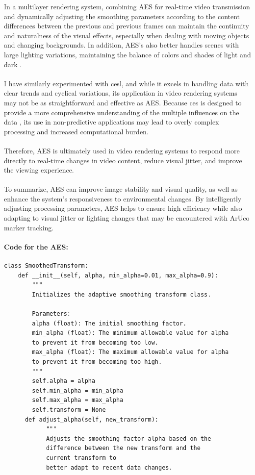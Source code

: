 \documentclass[12pt]{article}
\begin{document}
\begin{enumerate}
\begin{enumerate}
                        In a multilayer rendering system, combining AES for real-time video transmission and dynamically adjusting the smoothing parameters according to the content differences between the previous and previous frames can maintain the continuity and naturalness of the visual effects, especially when dealing with moving objects and changing backgrounds. In addition, AES's also better handles scenes with large lighting variations, maintaining the balance of colors and shades of light and dark \cite{7298776}.
                        \\\\
                        I have similarly experimented with \gls{cesl}, and while it excels in handling data with clear trends and cyclical variations, its application in video rendering systems may not be as straightforward and effective as AES. Because \gls{ces} is designed to provide a more comprehensive understanding of the multiple influences on the data \cite{ComplexES2018,Complex}, its use in non-predictive applications may lead to overly complex processing and increased computational burden.
                        \\\\
                        Therefore, AES is ultimately used in video rendering systems to respond more directly to real-time changes in video content, reduce visual jitter, and improve the viewing experience.
                        \\\\
                        To summarize, AES can improve image stability and visual quality, as well as enhance the system's responsiveness to environmental changes. By intelligently adjusting processing parameters, AES helps to ensure high efficiency while also adapting to visual jitter or lighting changes that may be encountered with ArUco marker tracking.
                        \paragraph{Code for the AES:}
                        \begin{verbatim}
class SmoothedTransform:
    def __init__(self, alpha, min_alpha=0.01, max_alpha=0.9):
        """
        Initializes the adaptive smoothing transform class.
        
        Parameters:
        alpha (float): The initial smoothing factor.
        min_alpha (float): The minimum allowable value for alpha 
        to prevent it from becoming too low.
        max_alpha (float): The maximum allowable value for alpha 
        to prevent it from becoming too high.
        """
        self.alpha = alpha
        self.min_alpha = min_alpha
        self.max_alpha = max_alpha
        self.transform = None
      def adjust_alpha(self, new_transform):
            """
            Adjusts the smoothing factor alpha based on the 
            difference between the new transform and the 
            current transform to 
            better adapt to recent data changes.
                                          

\end{verbatim}
\end{enumerate}
\end{enumerate}
\end{document}
